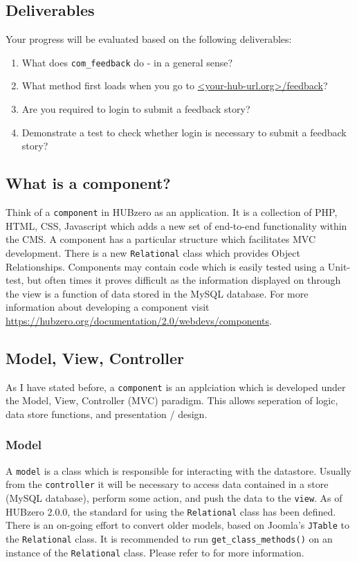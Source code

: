 \documentclass[10pt,letterpaper,titlepage]{article}
\begin{document}
\subsection{Deliverables}
Your progress will be evaluated based on the following deliverables: 
\begin{enumerate}
\item What does \texttt{com\_feedback} do - in a general sense?
\item What method first loads when you go to \url{<your-hub-url.org>/feedback}?
\item Are you required to login to submit a feedback story?
\item Demonstrate a test to check whether login is necessary to submit a feedback story?
\end{enumerate}

\subsection{What is a component?}
Think of a \texttt{component} in HUBzero as an application. It is a collection of PHP, HTML, CSS, Javascript which adds a new set of end-to-end functionality within the CMS. 
A component has a particular structure which facilitates MVC development. There is a new \texttt{Relational} class which provides Object Relationships. Components may contain code which is easily
tested using a Unit-test, but often times it proves difficult as the information displayed on through the view is a function of data stored in the MySQL database. For more information about developing a component visit \url{https://hubzero.org/documentation/2.0/webdevs/components}.

\subsection{Model, View, Controller}
As I have stated before, a \texttt{component} is an applciation which is developed under the Model, View, Controller (MVC) paradigm. This allows seperation of logic, data store functions, and presentation / design. 

\subsubsection{Model}
A \texttt{model} is a class which is responsible for interacting with the datastore. Usually from the \texttt{controller} it will be necessary to access data contained in a store (MySQL database), perform some action, and push the data to the \texttt{view}. As of HUBzero 2.0.0, the standard for using the \texttt{Relational} class has been defined. There is an on-going effort to convert older models, based on Joomla's \texttt{JTable} to the \texttt{Relational} class. It is recommended to run \texttt{get\_class\_methods()} on an instance of the \texttt{Relational} class. Please refer to  for more information.
\end{document}
